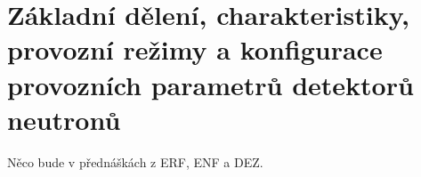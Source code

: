 \section[Režimy a provoz neutronových detektorů]{Základní dělení, charakteristiky, provozní režimy a konfigurace provozních parametrů detektorů neutronů}

Něco bude v přednáškách z ERF, ENF a DEZ.